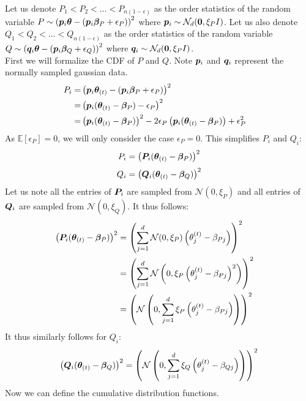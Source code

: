 \documentclass{article} %
\begin{document}
\begin{appendices}
	Let us denote $P_1 < P_2 < \dots < P_{n(1 - \epsilon)}$ as the order statistics of the random variable $P \sim \left({\bm{p}}_i {\bm{\theta}} - ({\bm{p}}_i {\bm{\beta}}_P + \epsilon_P)\right)^2$ where $ {\bm{p}}_i \sim \mathcal{N}_d({\bm{0}}, \xi_P I)$. Let us also denote $Q_1 < Q_2 < \dots < Q_{n(1 - \epsilon)}$ as the order statistics of the random variable $Q \sim \left({\bm{q}}_i {\bm{\theta}} - ({\bm{p}}_i {\bm{\beta}}_Q + \epsilon_Q)\right)^2$ where $ {\bm{q}}_i \sim \mathcal{N}_d({\bm{0}}, \xi_P I)$.\\
	First we will formalize the CDF of $P$ and $Q$. Note ${\bm{p}}_i$ and ${\bm{q}}_i$ represent the normally sampled gaussian data. 
	\begin{align}
		P_i = &\left({\bm{p}}_i{\bm{\theta}}_{(t)} - ({\bm{p}}_i {\bm{\beta}}_P + {\epsilon}_P)\right)^2 &&\\
		 = &\left({\bm{p}}_i({\bm{\theta}}_{(t)} - {\bm{\beta}}_P) - {\epsilon}_P\right)^2 &&\\
		= &\left({\bm{p}}_i({\bm{\theta}}_{(t)} - {\bm{\beta}}_P)\right)^2 - 2 {\epsilon}_P \left({\bm{p}}_i({\bm{\theta}}_{(t)} - {\bm{\beta}}_P)\right) + {\epsilon}_P^2 &&
	\end{align}
	As $\mathbb{E}\left[\epsilon_P\right] = 0$, we will only consider the case $\epsilon_P = 0$. This simplifies $P_i$ and $Q_i$:
	\begin{equation}
		P_i = \left({\bm{P}}_i({\bm{\theta}}_{(t)} - {\bm{\beta}}_P)\right)^2 
	\end{equation}
	\begin{equation}
		Q_i = \left({\bm{Q}}_i({\bm{\theta}}_{(t)} - {\bm{\beta}}_Q)\right)^2
	\end{equation}
	Let us note all the entries of ${\bm{P}}_i$ are sampled from $\mathcal{N}(0,\xi_P)$ and all entries of ${\bm{Q}}_i$ are sampled from $\mathcal{N}(0,\xi_Q)$.
	It thus follows:
	\begin{align*}
		\left({\bm{P}}_i({\bm{\theta}}_{(t)} - {\bm{\beta}}_P)\right)^2 &= \left(\sum_{j=1}^d\mathcal{N}(0,\xi_P)\left(\theta^{(t)}_j - \beta_{Pj}\right)\right)^2 &&\\
		&= \left(\sum_{j=1}^d \mathcal{N}\left(0,\xi_P\left(\theta_j^{(t)} - \beta_{Pj}\right)^2\right)\right)^2  &&\\
		&= \left(\mathcal{N}\left(0, \sum_{j=1}^d \xi_P\left(\theta_j^{(t)} - \beta_{Pj}\right)\right)\right)^2
	\end{align*}
	It thus similarly follows for $Q_i$:
	\begin{equation*}
		\left({\bm{Q}}_i({\bm{\theta}}_{(t)} - {\bm{\beta}}_Q)\right)^2 = \left(\mathcal{N}\left(0, \sum_{j=1}^d \xi_Q\left(\theta_j^{(t)} - \beta_{Qj}\right)\right)\right)^2
	\end{equation*}
	Now we can define the cumulative distribution functions.

\end{appendices}
\end{document}

